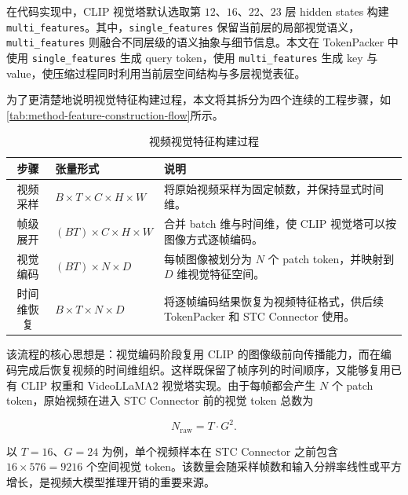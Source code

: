 \par 在代码实现中，CLIP 视觉塔默认选取第 $12$、$16$、$22$、$23$ 层 hidden states 构建 \texttt{multi\_features}。其中，\texttt{single\_features} 保留当前层的局部视觉语义，\texttt{multi\_features} 则融合不同层级的语义抽象与细节信息。本文在 TokenPacker 中使用 \texttt{single\_features} 生成 query token，使用 \texttt{multi\_features} 生成 key 与 value，使压缩过程同时利用当前层空间结构与多层视觉表征。

\par 为了更清楚地说明视觉特征构建过程，本文将其拆分为四个连续的工程步骤，如\autoref{tab:method-feature-construction-flow}所示。

\begin{table}[!htbp]
    \centering
    \caption{\label{tab:method-feature-construction-flow}视频视觉特征构建过程}
    \begin{tabularx}{\textwidth}{c l X}
        \toprule
        步骤 & 张量形式 & 说明 \\
        \midrule
        视频采样 & $B\times T\times C\times H\times W$ & 将原始视频采样为固定帧数，并保持显式时间维。 \\
        帧级展开 & $(BT)\times C\times H\times W$ & 合并 batch 维与时间维，使 CLIP 视觉塔可以按图像方式逐帧编码。 \\
        视觉编码 & $(BT)\times N\times D$ & 每帧图像被划分为 $N$ 个 patch token，并映射到 $D$ 维视觉特征空间。 \\
        时间维恢复 & $B\times T\times N\times D$ & 将逐帧编码结果恢复为视频特征格式，供后续 TokenPacker 和 STC Connector 使用。 \\
        \bottomrule
    \end{tabularx}
\end{table}

\par 该流程的核心思想是：视觉编码阶段复用 CLIP 的图像级前向传播能力，而在编码完成后恢复视频的时间维组织。这样既保留了帧序列的时间顺序，又能够复用已有 CLIP 权重和 VideoLLaMA2 视觉塔实现。由于每帧都会产生 $N$ 个 patch token，原始视频在进入 STC Connector 前的视觉 token 总数为

\begin{equation}
    \label{equ:method-raw-token-count}
    N_{\mathrm{raw}} = T \cdot G^2.
\end{equation}

\par 以 $T=16$、$G=24$ 为例，单个视频样本在 STC Connector 之前包含 $16\times 576=9216$ 个空间视觉 token。该数量会随采样帧数和输入分辨率线性或平方增长，是视频大模型推理开销的重要来源。

